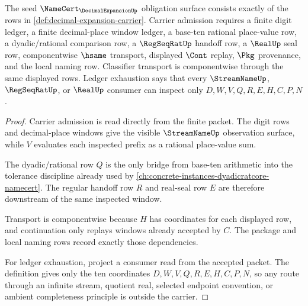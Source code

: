 \begin{theorem}\label{thm:decimal-expansion-namecert-obligations}
The seed $\NameCert_{\DecimalExpansionUp}$ obligation surface consists exactly
of the rows in \autoref{def:decimal-expansion-carrier}. Carrier admission
requires a finite digit ledger, a finite decimal-place window ledger, a
base-ten rational place-value row, a dyadic/rational comparison row, a
$\RegSeqRatUp$ handoff row, a $\RealUp$ seal row, componentwise $\hsame$
transport, displayed $\Cont$ replay, $\Pkg$ provenance, and the local naming
row. Classifier transport is componentwise through the same displayed rows.
Ledger exhaustion says that every $\StreamNameUp$, $\RegSeqRatUp$, or
$\RealUp$ consumer can inspect only $D,W,V,Q,R,E,H,C,P,N$.
\end{theorem}
\begin{proof}
Carrier admission is read directly from the finite packet. The digit rows and
decimal-place windows give the visible $\StreamNameUp$ observation surface,
while $V$ evaluates each inspected prefix as a rational place-value sum.

The dyadic/rational row $Q$ is the only bridge from base-ten arithmetic into
the tolerance discipline already used by
\autoref{ch:concrete-instances-dyadicratcore-namecert}. The regular handoff
row $R$ and real-seal row $E$ are therefore downstream of the same inspected
window.

Transport is componentwise because $H$ has coordinates for each displayed
row, and continuation only replays windows already accepted by $C$. The
package and local naming rows record exactly those dependencies.

For ledger exhaustion, project a consumer read from the accepted packet. The
definition gives only the ten coordinates $D,W,V,Q,R,E,H,C,P,N$, so any route
through an infinite stream, quotient real, selected endpoint convention, or
ambient completeness principle is outside the carrier.
\end{proof}

